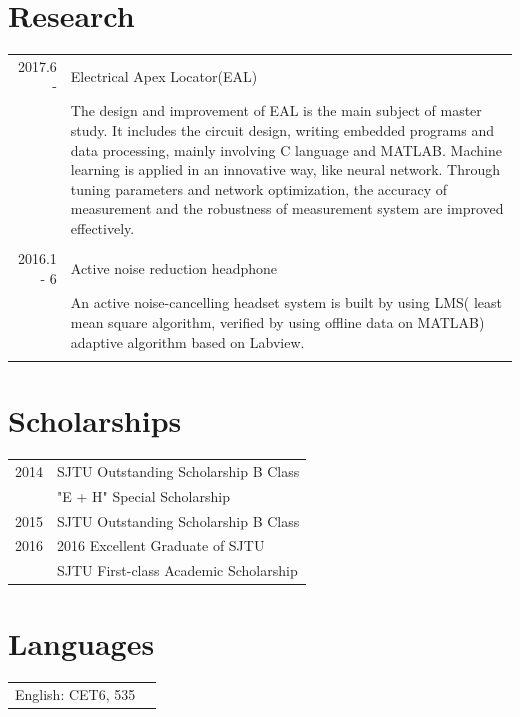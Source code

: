 \documentclass[a4paper,11pt]{article}
\begin{document}
\section{Research}
\begin{tabular}{r|p{11cm}}
 \textsc{2017.6 -} & Electrical Apex Locator(EAL) \\&\footnotesize{The design and improvement of EAL is the main subject of master study. It includes the circuit design, writing embedded programs and data processing, mainly involving C language and MATLAB. Machine learning is applied in an innovative way, like neural network. Through tuning parameters and network optimization, the accuracy of measurement and the robustness of measurement system are improved effectively.}\\\multicolumn{2}{c}{} \\
 \textsc{2016.1 - 6} & Active noise reduction headphone \\&\footnotesize{An active noise-cancelling headset system is built by using LMS( least mean square algorithm, verified by using offline data on MATLAB) adaptive algorithm based on Labview.}\\\multicolumn{2}{c}{} \\
\end{tabular}

\section{Scholarships}
\begin{tabular}{rl}
 \textsc{2014}  & SJTU Outstanding Scholarship B Class\\
& "E + H" Special Scholarship\\
\textsc{2015} & SJTU Outstanding Scholarship B Class\\
\textsc{2016} & 2016 Excellent Graduate of SJTU\\
&  SJTU First-class Academic Scholarship\\

\end{tabular}

\section{Languages}
\begin{tabular}{rl}
English: CET6, 535\\
\end{tabular}
\end{document}
